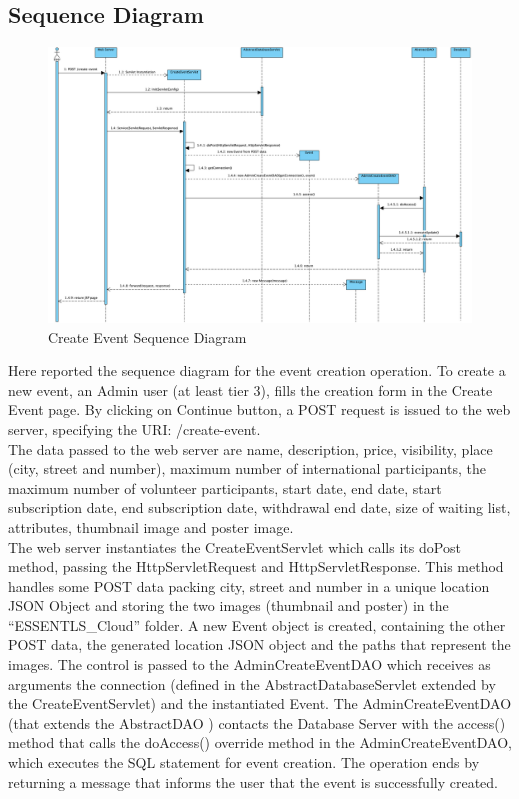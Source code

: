 \subsection{Sequence Diagram}

\begin{figure}[H]
    \centering
    \includegraphics[width=1\textwidth]{images/CreateEventSequence.png}
    \caption{Create Event Sequence Diagram}
    \label{fig:create event sequence diagram}
\end{figure}

Here reported the sequence diagram for the event creation operation.
To create a new event, an Admin user (at least tier 3), fills the creation form in the Create Event page.
By clicking on Continue button, a POST request is issued to the web server, specifying the URI: /create-event. \\
The data passed to the web server are name, description, price, visibility, place (city, street and number),
maximum number of international participants, the maximum number of volunteer participants, start date, end date,
start subscription date, end subscription date, withdrawal end date, size of waiting list, attributes,
thumbnail image and poster image. \\
The web server instantiates the CreateEventServlet which calls its doPost method, passing the HttpServletRequest
and HttpServletResponse. This method handles some POST data packing city, street and number in a unique location JSON
Object and storing the two images (thumbnail and poster) in the “ESSENTLS\_Cloud” folder.
A new Event object is created, containing the other POST data, the generated location JSON object and the paths that
represent the images. The control is passed to the AdminCreateEventDAO which receives as arguments the connection
(defined in the AbstractDatabaseServlet extended by the CreateEventServlet) and the instantiated Event.
The AdminCreateEventDAO (that extends the AbstractDAO ) contacts the Database Server with the access() method that
calls the doAccess() override method in the AdminCreateEventDAO, which executes the SQL statement for event creation.
The operation ends by returning a message that informs the user that the event is successfully created.